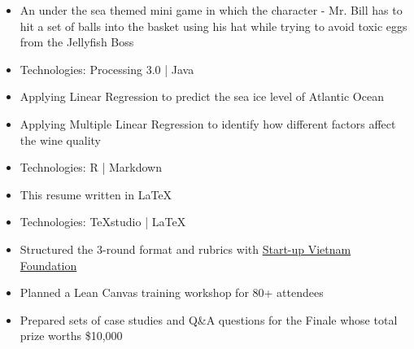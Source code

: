 \documentclass[10pt,a4paper,ragged2e]{altacv}
\begin{document}


\begin{fullwidth}
\makecvheader
\end{fullwidth}



\begin{itemize}
\item An under the sea themed mini game in which the character - Mr. Bill has to hit a set of balls into the basket using his hat while trying to avoid toxic eggs from the Jellyfish Boss
\item Technologies: Processing 3.0 | Java
\end{itemize}

\divider

\begin{itemize}
\item Applying Linear Regression to predict the sea ice level of Atlantic Ocean
\item Applying Multiple Linear Regression to identify how different factors affect the wine quality
\item Technologies: R | Markdown
\end{itemize}

\divider

\begin{itemize}
	\item This resume written in LaTeX
	\item Technologies: TeXstudio | LaTeX
\end{itemize}



\begin{itemize}
	\item Structured the 3-round format and rubrics with {\href{https://svf.org.vn/}{Start-up Vietnam Foundation}} 
	\item Planned a Lean Canvas training workshop for 80+ attendees
	\item Prepared sets of case studies and Q\&A questions for the Finale whose total prize worths \$10,000
\end{itemize}
\end{document}
